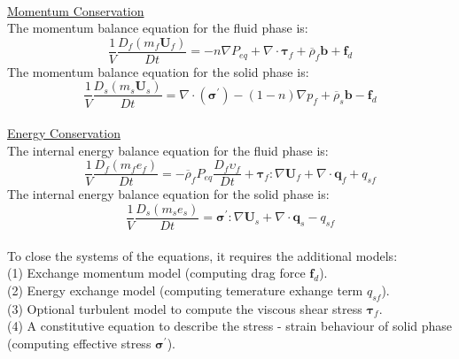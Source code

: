 \documentclass[preprint,12pt]{elsarticle}
\begin{document}
%
\underline{\hspace{5in}}\\
\underline{\textsf{Momentum Conservation}}\\
The momentum balance equation for the fluid phase is:\\
%
%
\begin{equation}
     \frac{1}{V}\frac{D_f(m_f \pmb{U}_f)}{Dt} = -n\nabla P_{eq} +  \nabla \cdot \pmb{\tau}_f + \overline{\rho}_f \pmb{b} +
     \pmb{f}_{d}
\end{equation}
%
%
The momentum balance equation for the solid phase is:\\
%
%
\begin{equation}
     \frac{1}{V}\frac{D_s(m_s \pmb{U}_s)}{Dt} = 
    \nabla \cdot (\pmb{\sigma}^\prime) - (1-n) \nabla p_f 
    + \overline{\rho}_s \pmb{b}
    - \pmb{f}_{d}
\end{equation}
%
%
\underline{\hspace{5in}}\\
\underline{\textsf{Energy Conservation}}\\
The internal energy balance equation for the fluid phase is:
%
%
\begin{equation}
    \label{fluidenergy}
     \frac{1}{V}\frac{D_f(m_f e_f)}{Dt} = 
    -\overline{\rho}_f P_{eq}  \frac{D_f\upsilon_f}{Dt} + \pmb{\tau}_f : \nabla \pmb{U}_f + \nabla \cdot \pmb{q}_f + q_{sf}
\end{equation}
%
%
The internal energy balance equation for the solid phase is:
%
%
\begin{equation}
    \label{solidenergy}
     \frac{1}{V}\frac{D_s(m_s e_s)}{Dt} = \pmb{\sigma}^\prime:\nabla \pmb{U}_s + \nabla \cdot \pmb{q}_s - q_{sf} 
\end{equation}
%
%
\underline{\hspace{5in}}\\
To close the systems of the equations, it requires the additional models: \\
(1) Exchange momentum model (computing drag force $\pmb{f}_{d}$). \\
(2) Energy exchange model (computing temerature exhange term $q_{sf}$). \\
(3) Optional turbulent model to compute the viscous shear stress $\pmb{\tau}_f$.\\
(4) A constitutive equation to describe the stress - strain behaviour of solid phase (computing effective stress $\pmb{\sigma}^\prime$). \\
\end{document}
